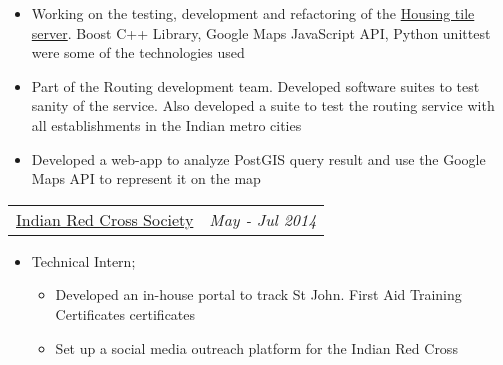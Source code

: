 \documentclass[margin]{res}
\begin{document}
\begin{resume}
\begin{itemize}
\begin{itemize}
                        \item Working on the testing, development and refactoring of the \href {https://housing.com/blog/2015/01/24/tech-talesthe-mystery-of-our-tiled-map-interface/}{Housing tile server}. Boost C++ Library, Google Maps JavaScript API, Python unittest were some of the technologies used
                        \item Part of the Routing development team. Developed software suites to test sanity of the service. Also developed a suite to test the routing service with all establishments in the Indian metro cities
                        \item Developed a web-app to analyze PostGIS query result and use the Google Maps API to represent it on the map
                        \end{itemize}
					 \end{itemize} 
                  \begin{tabular}{p{4.2in} r}  %
                  \href{http://www.indianredcross.org/}{Indian Red Cross Society} &  \textit{May - Jul 2014} 
                  \end{tabular}	
                   \begin{itemize} %
                   \item[] Technical Intern;
                   \begin{itemize}
                    \item Developed an in-house portal to track St John. First Aid Training Certificates certificates
                    \item Set up a social media outreach platform for the Indian Red Cross
                    \end{itemize} 
		   \end{itemize} 
                   

\end{resume}
\end{document}
